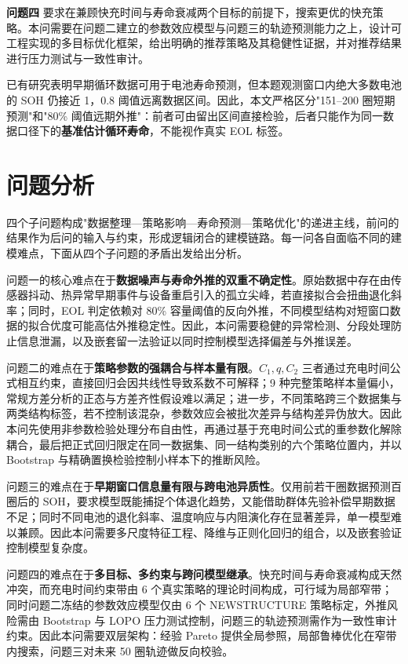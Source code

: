 \documentclass[withoutpreface]{cumcmthesis}
\newcommand{\paperstrong}[1]{\textbf{#1}}
\begin{document}
\textbf{问题四} 要求在兼顾快充时间与寿命衰减两个目标的前提下，搜索更优的快充策略。本问需要在问题二建立的参数效应模型与问题三的轨迹预测能力之上，设计可工程实现的多目标优化框架，给出明确的推荐策略及其稳健性证据，并对推荐结果进行压力测试与一致性审计。

已有研究表明早期循环数据可用于电池寿命预测\cite{severson2019}，但本题观测窗口内绝大多数电池的 SOH 仍接近 1，0.8 阈值远离数据区间。因此，本文严格区分"151--200 圈短期预测"和"80\% 阈值远期外推"：前者可由留出区间直接检验，后者只能作为同一数据口径下的\paperstrong{基准估计循环寿命}，不能视作真实 EOL 标签。

\section{问题分析}

四个子问题构成"数据整理—策略影响—寿命预测—策略优化"的递进主线，前问的结果作为后问的输入与约束，形成逻辑闭合的建模链路。每一问各自面临不同的建模难点，下面从四个子问题的矛盾出发给出分析。

问题一的核心难点在于\textbf{数据噪声与寿命外推的双重不确定性}。原始数据中存在由传感器抖动、热异常早期事件与设备重启引入的孤立尖峰，若直接拟合会扭曲退化斜率；同时，EOL 判定依赖对 80\% 容量阈值的反向外推，不同模型结构对短窗口数据的拟合优度可能高估外推稳定性。因此，本问需要稳健的异常检测、分段处理防止信息泄漏，以及嵌套留一法验证以同时控制模型选择偏差与外推误差。

问题二的难点在于\textbf{策略参数的强耦合与样本量有限}。$C_1,q,C_2$ 三者通过充电时间公式相互约束，直接回归会因共线性导致系数不可解释；9 种完整策略样本量偏小，常规方差分析的正态与方差齐性假设难以满足；进一步，不同策略跨三个数据集与两类结构标签，若不控制该混杂，参数效应会被批次差异与结构差异伪放大。因此本问先使用非参数检验处理分布自由性，再通过基于充电时间公式的重参数化解除耦合，最后把正式回归限定在同一数据集、同一结构类别的六个策略位置内，并以 Bootstrap 与精确置换检验控制小样本下的推断风险。

问题三的难点在于\textbf{早期窗口信息量有限与跨电池异质性}。仅用前若干圈数据预测百圈后的 SOH，要求模型既能捕捉个体退化趋势，又能借助群体先验补偿早期数据不足；同时不同电池的退化斜率、温度响应与内阻演化存在显著差异，单一模型难以兼顾。因此本问需要多尺度特征工程、降维与正则化回归的组合，以及嵌套验证控制模型复杂度。

问题四的难点在于\textbf{多目标、多约束与跨问模型继承}。快充时间与寿命衰减构成天然冲突，而充电时间约束带由 6 个真实策略的理论时间构成，可行域为局部窄带；同时问题二冻结的参数效应模型仅由 6 个 NEWSTRUCTURE 策略标定，外推风险需由 Bootstrap 与 LOPO 压力测试控制，问题三的轨迹预测需作为一致性审计约束。因此本问需要双层架构：经验 Pareto 提供全局参照，局部鲁棒优化在窄带内搜索，问题三对未来 50 圈轨迹做反向校验。
\end{document}
